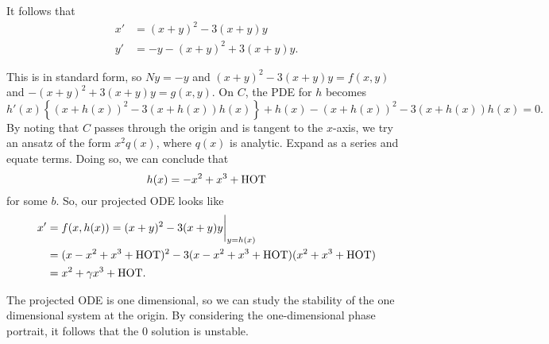 \documentclass{article}
\begin{document}
\begin{example}{}
        It follows that 
        \begin{align*}
            x' &= (x + y)^2 - 3(x + y) y \\
            y' &= -y - (x + y)^2 + 3(x + y) y.
        \end{align*}

        This is in standard form, so $Ny = -y$ and $(x + y)^2 - 3(x + y) y = f(x, y)$ and $-(x + y)^2 + 3(x + y) y = g(x, y)$. On $C$, the PDE for $h$ becomes 
        \[
            h'(x) \left\{ (x + h(x))^2 - 3(x + h(x))h(x)\right\} + h(x) - (x + h(x))^2 - 3(x + h(x))h(x) = 0.
        \]
        By noting that $C$ passes through the origin and is tangent to the $x$-axis, we try an ansatz of the form $x^2 q(x)$, where $q(x)$ is analytic. Expand as a series and equate terms. Doing so, we can conclude that 
        \[
            h(x) = -x^2 + x^3 + \text{HOT}
        \]
        for some $b$. So, our projected ODE looks like 
        \begin{align*}
            x' &= f(x, h(x)) = (x + y)^2 - 3(x + y)y \bigg|_{y = h(x)} \\
            &= (x - x^2 + x^3 + \text{HOT})^2 - 3(x - x^2 + x^3 + \text{HOT})(x^2 + x^3 + \text{HOT}) \\
            &= x^2 + \gamma x^3 + \text{HOT}.
        \end{align*}

        The projected ODE is one dimensional, so we can study the stability of the one dimensional system at the origin. By considering the one-dimensional phase portrait, it follows that the $0$ solution is unstable. 
    \end{example}
\end{document}
